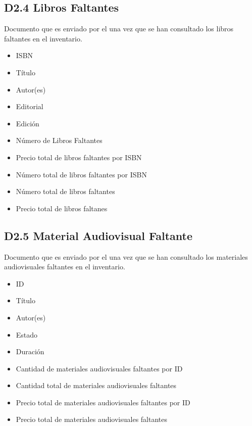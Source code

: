  \subsection{D2.4 Libros Faltantes}

  Documento que es enviado por el  una vez que se han consultado los libros faltantes en el inventario. 
  
  \begin{itemize}
  \item ISBN 
  \item Título
  \item Autor(es)
  \item Editorial
  \item Edición
  \item Número de Libros Faltantes
  \item Precio total de libros faltantes por ISBN
  \item Número total de libros faltantes por ISBN
  \item Número total de libros faltantes
  \item Precio total de libros faltanes
  \end{itemize}
  
  \subsection{D2.5 Material Audiovisual Faltante}

  Documento que es enviado por el  una vez que se han consultado los materiales audiovisuales faltantes en el inventario. 
  
  \begin{itemize}
  \item ID 
  \item Título
  \item Autor(es)
  \item Estado
  \item Duración
  \item Cantidad de materiales audiovisuales faltantes por ID
  \item Cantidad total de materiales audiovisuales faltantes
  \item Precio total de materiales audiovisuales faltantes por ID
  \item Precio total de materiales audiovisuales faltantes 
  \end{itemize}
  
